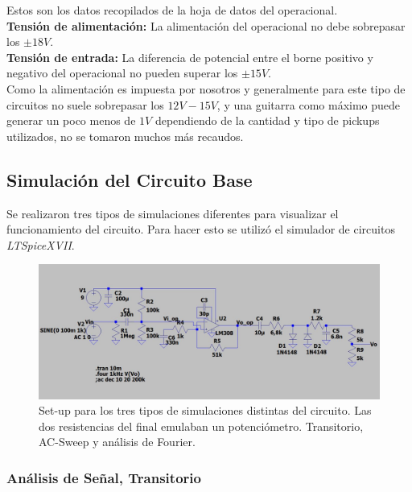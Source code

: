 Estos son los datos recopilados de la hoja de datos del operacional.\\
\textbf{Tensión de alimentación:} La alimentación del operacional no debe sobrepasar los $\pm 18V$.\\
\textbf{Tensión de entrada:} La diferencia de potencial entre el borne positivo y negativo del operacional no pueden superar los $\pm 15V$.\\
Como la alimentación es impuesta por nosotros y generalmente para este tipo de circuitos no suele sobrepasar los $12V-15V$, y una guitarra como máximo puede generar un poco menos de $1V$ dependiendo de la cantidad y tipo de pickups utilizados, no se tomaron muchos más recaudos.

\break
\subsection{Simulación del Circuito Base}

Se realizaron tres tipos de simulaciones diferentes para visualizar el funcionamiento del circuito. Para hacer esto se utilizó el simulador de circuitos \textit{LTSpiceXVII}.

\begin{figure}[H]
	\centering
	\includegraphics[width=1\textwidth, trim={0 0 0 0}, clip]{Ejercicio5/Imagenes/Circuito_base/Sim/sim_base.JPG}
	\caption{Set-up para los tres tipos de simulaciones distintas del circuito. Las dos resistencias del final emulaban un potenciómetro. Transitorio, AC-Sweep y análisis de Fourier.}
	\label{fig:sim_base}
\end{figure}

\subsubsection{Análisis de Señal, Transitorio}

